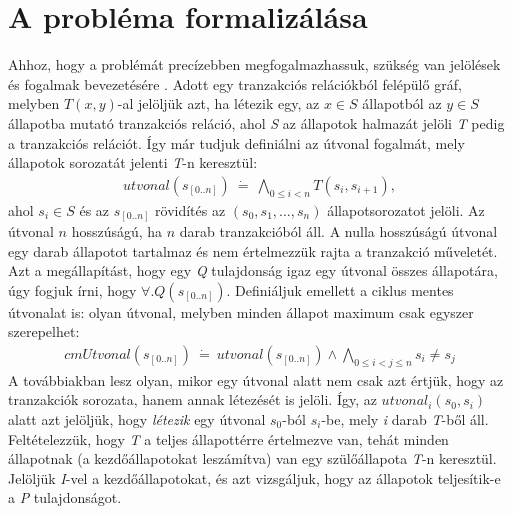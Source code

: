 \section{A probléma formalizálása}
\label{sec:problema_form}

Ahhoz, hogy a problémát precízebben megfogalmazhassuk, szükség van jelölések és fogalmak bevezetésére \cite{k_induction_article}. Adott egy tranzakciós relációkból felépülő gráf, melyben $T(x, y)$-al jelöljük azt, ha létezik egy, az $x \in S$ állapotból az $y \in S$ állapotba mutató tranzakciós reláció, ahol \emph{S} az állapotok halmazát jelöli \textit{T} pedig a tranzakciós relációt. Így már tudjuk definiálni az útvonal fogalmát, mely állapotok sorozatát jelenti \emph{T}-n keresztül:
\begin{align}
	\label{eq:relacio_sor}
	\mathit{utvonal}(s_{[0..n]})~\dot{=}~\bigwedge_{0 \leq i < n} T(s_{i}, s_{i+1}),
\end{align}
ahol $s_i \in S$ és az $s_{[0..n]}$ rövidítés az $(s_{0}, s_{1}, \dots, s_{n})$ állapotsorozatot jelöli. Az útvonal $n$ hosszúságú, ha $n$ darab tranzakcióból áll. A nulla hosszúságú útvonal egy darab állapotot tartalmaz és nem értelmezzük rajta a tranzakció műveletét. Azt a megállapítást, hogy egy \emph{Q} tulajdonság igaz egy útvonal összes állapotára, úgy fogjuk írni, hogy $\forall . Q(s_{[0..n]})$.
\newline
\newline
Definiáljuk emellett a ciklus mentes útvonalat is: olyan útvonal, melyben minden állapot maximum csak egyszer szerepelhet:
\begin{align}
	\mathit{cmUtvonal}(s_{[0..n]})~\dot{=}~\mathit{utvonal}(s_{[0..n]}) \wedge \bigwedge_{0 \leq i < j \leq n} s_{i} \neq s_{j}
\end{align}
A továbbiakban lesz olyan, mikor egy útvonal alatt nem csak azt értjük, hogy az tranzakciók sorozata, hanem annak létezését is jelöli. Így, az $\mathit{utvonal}_{i}(s_{0}, s_{i})$ alatt azt jelöljük, hogy \emph{létezik} egy útvonal $s_{0}$-ból $s_{i}$-be, mely \emph{i} darab \emph{T}-ből áll.
\newline
\newline
Feltételezzük, hogy \emph{T} a teljes állapottérre értelmezve van, tehát minden állapotnak (a kezdőállapotokat leszámítva) van egy szülőállapota \emph{T}-n keresztül. Jelöljük \emph{I}-vel a kezdőállapotokat, és azt vizsgáljuk, hogy az állapotok teljesítik-e a \emph{P} tulajdonságot.

